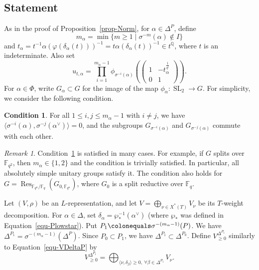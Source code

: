 \documentclass[11pt]{amsart}
\numberwithin{equation}{section}
\theoremstyle{definition}
\newtheorem{condition}[theorem]{Condition}
\theoremstyle{remark}
\newtheorem{rmk}[theorem]{Remark}
\newcommand{\FF}{\mathbb{F}}
\newcommand{\QQ}{\mathbb{Q}}
\DeclareMathOperator{\SL}{SL}
\DeclareMathOperator{\Res}{Res}
\begin{document}
\subsection{Statement}
As in the proof of Proposition~\ref{prop-Norm},  for $\alpha\in \Delta^P$, define 
\begin{equation}\label{malpha-equ2}
 m_{\alpha} =\min \{ m \geq 1 \mid 
 \sigma^{-m}(\alpha) \notin I \}
\end{equation}
and $t_{\alpha}=t^{-1}\alpha(\varphi(\delta_{\alpha}(t)))^{-1} =t \alpha(\delta_{\alpha}(t))^{-1} \in t^{\QQ}$, where $t$ is an indeterminate. Also set 
\begin{equation}\label{utalpha}
 u_{t,\alpha}=\prod_{i=1}^{m_{\alpha}-1} \phi_{\sigma^{-i}(\alpha)} 
 \left( \begin{pmatrix}
1&-t_{\alpha}^{\frac{1}{q^i}}\\0&1
\end{pmatrix} \right).    
\end{equation}
For $\alpha\in \Phi$, write $G_\alpha\subset G$ for the image of the map $\phi_\alpha\colon \SL_2\to G$. For simplicity, we consider the following condition.

\begin{condition}\label{cond-commute}
For all $1\leq i, j \leq m_\alpha-1$ with $i\neq j$, we have $\langle \sigma^{-i}(\alpha), \sigma^{-j}(\alpha^\vee) \rangle=0$, and the subgroups $G_{\sigma^{-i}(\alpha)}$ and $G_{\sigma^{-j}(\alpha)}$ commute with each other.
\end{condition}

\begin{rmk}
Condition~\ref{cond-commute} is satisfied in many cases. For example, if $G$ splits over $\FF_{q^2}$, then $m_\alpha\in \{1,2\}$ and the condition is trivially satisfied. In particular, all absolutely simple unitary groups satisfy it. The condition also holds for $G=\Res_{\FF_{q^n}/\FF_q}(G_{0,\FF_{q^n}})$, where $G_0$ is a split reductive over $\FF_q$.
\end{rmk}

Let $(V,\rho)$ be an $L$-representation, and let $V=\bigoplus_{\nu \in X^*(T)}V_\nu$ be its $T$-weight decomposition. For $\alpha\in \Delta$, set $\delta_{\alpha}=\wp_*^{-1}(\alpha^{\vee})$ (where $\wp_*$ was defined in Equation~\eqref{equ-Plowstar}). Put $P_1 \colonequals \sigma^{-(m_\alpha-1)}(P)$. We have $\Delta^{P_1}=\sigma^{-(m_\alpha-1)}(\Delta^P)$. Since $P_0\subset P_1$, we have $\Delta^{P_1}\subset \Delta^{P_0}$. Define $V^{\Delta^{P_1}}_{\geq 0}$ similarly to Equation~\eqref{equ-VDeltaP} by 
\begin{equation}\label{equ-VDeltaP0}
V_{\geq 0}^{\Delta^{P_1}} = \bigoplus_{\langle \nu,\delta_\beta \rangle \geq 0, \ 
 \forall \beta\in \Delta^{P_1}} V_\nu.
\end{equation}
\end{document}
